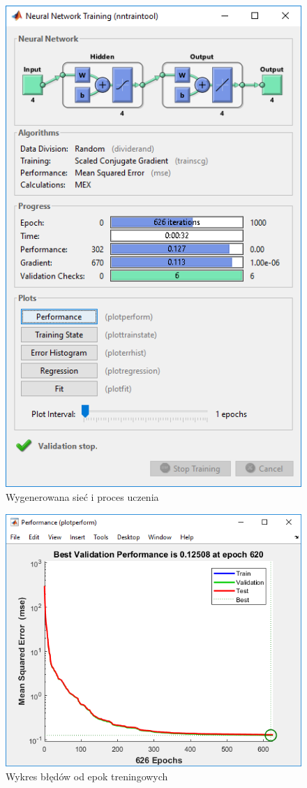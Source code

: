 \documentclass[10pt,a4paper,titlepage]{article}
\begin{document}
	\begin{figure}[H]
		\center
		\includegraphics[width=\textwidth]{nn.png}
		\caption{Wygenerowana sieć i proces uczenia}
	\end{figure}

	\begin{figure}[H]
		\center
		\includegraphics[width=.88\textwidth]{perf.png}
		\caption{Wykres błędów od epok treningowych}
	\end{figure}
\end{document}

